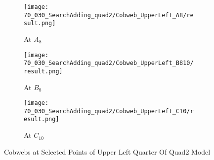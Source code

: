 \begin{figure}
    \centering
    \begin{subfigure}{0.3\textwidth}
        \centering
        \texttt{[image: 70\_030\_SearchAdding\_quad2/Cobweb\_UpperLeft\_A8/result.png]}
        \caption{At $A_{8}$}
    \end{subfigure}
    \begin{subfigure}{0.3\textwidth}
        \centering
        \texttt{[image: 70\_030\_SearchAdding\_quad2/Cobweb\_UpperLeft\_B810/result.png]}
        \caption{At $B_{8}$}
    \end{subfigure}
    \begin{subfigure}{0.3\textwidth}
        \centering
        \texttt{[image: 70\_030\_SearchAdding\_quad2/Cobweb\_UpperLeft\_C10/result.png]}
        \caption{At $C_{10}$}
    \end{subfigure}
    \caption{Cobwebs at Selected Points of Upper Left Quarter Of Quad2 Model}
\end{figure}